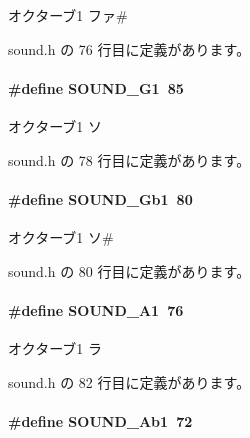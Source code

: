 オクターブ1 ファ\# 



 sound.\+h の 76 行目に定義があります。

\paragraph[{S\+O\+U\+N\+D\+\_\+\+G1}]{\setlength{\rightskip}{0pt plus 5cm}\#define S\+O\+U\+N\+D\+\_\+\+G1~85}\label{sound_8h_a077f7dc14c95e192d7edf3c8eb72c5da_a077f7dc14c95e192d7edf3c8eb72c5da}


オクターブ1 ソ 



 sound.\+h の 78 行目に定義があります。

\paragraph[{S\+O\+U\+N\+D\+\_\+\+Gb1}]{\setlength{\rightskip}{0pt plus 5cm}\#define S\+O\+U\+N\+D\+\_\+\+Gb1~80}\label{sound_8h_af064bb5dbd237d2fe7e954ee31cd3ca4_af064bb5dbd237d2fe7e954ee31cd3ca4}


オクターブ1 ソ\# 



 sound.\+h の 80 行目に定義があります。

\paragraph[{S\+O\+U\+N\+D\+\_\+\+A1}]{\setlength{\rightskip}{0pt plus 5cm}\#define S\+O\+U\+N\+D\+\_\+\+A1~76}\label{sound_8h_a0a5faefe8dfea062eb628bd9b6aba261_a0a5faefe8dfea062eb628bd9b6aba261}


オクターブ1 ラ 



 sound.\+h の 82 行目に定義があります。

\paragraph[{S\+O\+U\+N\+D\+\_\+\+Ab1}]{\setlength{\rightskip}{0pt plus 5cm}\#define S\+O\+U\+N\+D\+\_\+\+Ab1~72}\label{sound_8h_acf1942377e486c3d28326ea144b0c9f0_acf1942377e486c3d28326ea144b0c9f0}


